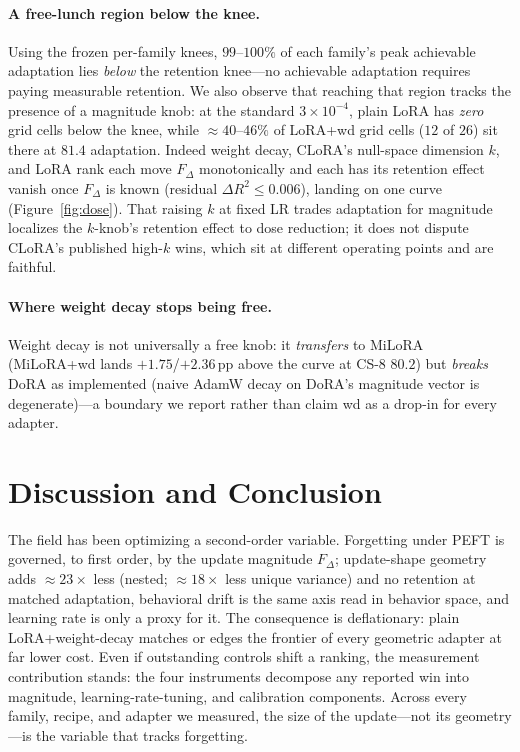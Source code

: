 \documentclass[11pt]{article}
\newcommand{\dw}{F_{\Delta}}
\begin{document}
\paragraph{A free-lunch region below the knee.} Using the frozen per-family knees,
$99$--$100\%$ of each family's peak achievable adaptation lies \emph{below} the
retention knee---no achievable adaptation requires paying measurable retention. We
also observe that reaching that region tracks the presence of a magnitude knob: at
the standard $3{\times}10^{-4}$, plain LoRA has \emph{zero} grid cells below the
knee, while $\approx\!40$--$46\%$ of LoRA{+}wd grid cells ($12$ of $26$) sit there
at $81.4$ adaptation. Indeed weight decay, CLoRA's null-space dimension $k$, and LoRA rank
each move $\dw$ monotonically and each has its retention effect vanish once $\dw$
is known (residual $\Delta R^2\!\le\!0.006$), landing on one curve
(Figure~\ref{fig:dose}). That raising $k$ at fixed LR trades adaptation for
magnitude localizes the $k$-knob's retention effect to dose reduction; it does not
dispute CLoRA's published high-$k$ wins, which sit at different operating points
and are faithful.

\paragraph{Where weight decay stops being free.} Weight decay is not universally a
free knob: it \emph{transfers} to MiLoRA (MiLoRA{+}wd lands $+1.75$/$+2.36$\,pp
above the curve at CS-8 $80.2$) but \emph{breaks} DoRA as implemented (naive AdamW
decay on DoRA's magnitude vector is degenerate)---a boundary we report rather than
claim wd as a drop-in for every adapter.

\section{Discussion and Conclusion}\label{sec:conclusion}
The field has been optimizing a second-order variable. Forgetting under PEFT is
governed, to first order, by the update magnitude $\dw$; update-shape geometry
adds $\approx\!23\times$ less (nested; $\approx\!18\times$ less unique variance)
and no retention at matched adaptation, behavioral drift is the same axis read
in behavior space, and learning rate is only a proxy for it. The consequence is
deflationary: plain LoRA{+}weight-decay matches or edges the frontier of every
geometric adapter at far lower cost. Even if outstanding controls shift a
ranking, the measurement contribution stands: the four instruments decompose any
reported win into magnitude, learning-rate-tuning, and calibration components.
Across every family, recipe, and adapter we measured, the size of the update---not
its geometry---is the variable that tracks forgetting.
\end{document}
